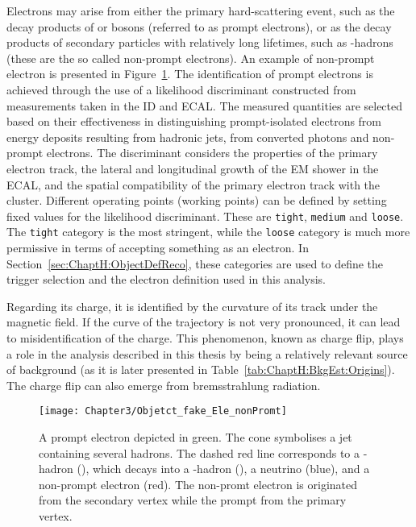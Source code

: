 Electrons may arise from either the primary hard-scattering event, such as the decay 
products of \PW or \PZ bosons (referred to as prompt electrons), or as the 
decay products of secondary particles with relatively long lifetimes, such as \Pbottom-hadrons 
(these are the so called non-prompt electrons). 
An example of non-prompt electron is presented in Figure~\ref{fig:ChapReco:NonPromptElectron}. 
The identification of prompt electrons is achieved through the use of a likelihood discriminant 
constructed from measurements taken in the ID and ECAL. The measured quantities are selected 
based on their effectiveness in distinguishing prompt-isolated electrons from energy deposits 
resulting from hadronic jets, from converted photons and non-prompt electrons. 
The discriminant considers the properties of the primary electron track, the lateral and longitudinal 
growth of the EM shower in the ECAL, and the spatial compatibility of the primary 
electron track with the cluster. 
Different operating points (working points) can be defined by setting fixed values for the likelihood discriminant.
These are \texttt{tight}, \texttt{medium} and \texttt{loose}. %
The \texttt{tight} category is the most stringent, while the \texttt{loose} category is much more permissive in
terms of accepting something as an electron. In Section~\ref{sec:ChaptH:ObjectDefReco}, these categories are
used to define the trigger selection and the electron definition used in this analysis.

Regarding its charge, it is identified by the curvature of its track under the magnetic field. If the curve of the trajectory is not very pronounced, 
it can lead to misidentification of the charge. This phenomenon, known as charge flip, plays a role in the analysis described
in this thesis by being a relatively relevant source of background (as it is later presented in Table~\ref{tab:ChaptH:BkgEst:Origins}).
The charge flip can also emerge from bremsstrahlung radiation.


\begin{figure}
	\centering
 	\texttt{[image: Chapter3/Objetct\_fake\_Ele\_nonPromt]}
  	\caption{A prompt electron depicted in green. 
	The cone symbolises a jet containing several hadrons.
	 The dashed red line corresponds to a \Pbottom-hadron (\PBminus),
	which decays into a \Pcharm-hadron (\APDzero), a neutrino (blue), and a non-prompt electron (red).
	The non-promt electron is originated from the secondary vertex while the prompt from the primary vertex.}
	 \label{fig:ChapReco:NonPromptElectron}
\end{figure}

